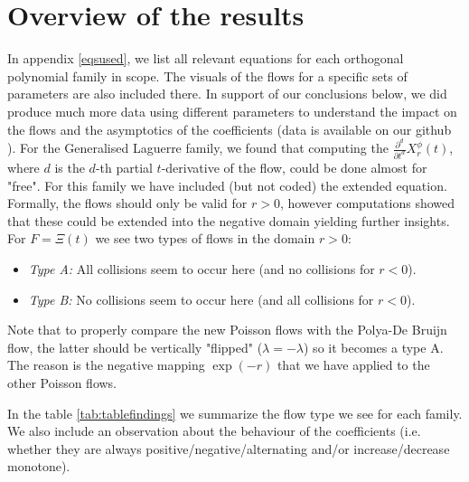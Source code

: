 \documentclass[a4paper,11pt,twoside]{amsart}
\begin{document}
\section{Overview of the results} \label{results}
In appendix \ref{eqsused}, we list all relevant equations for each orthogonal polynomial family in scope. The visuals of the flows for a specific sets of parameters are also included there. In support of our conclusions below, we did produce much more data using different parameters to understand the impact on the flows and the asymptotics of the coefficients (data is available on our github \cite{git}). For the Generalised Laguerre family, we found that computing the $\frac{\partial^{d}}{\partial t^{d}} X^{\mathcal{\phi}}_r(t)$, where $d$ is the $d$-th partial $t$-derivative of the flow, could be done almost for "free". For this family we have included (but not coded) the extended equation.  
Formally, the flows should only be valid for $r > 0$, however computations showed that these could be extended into the negative domain yielding further insights. For $F=\Xi(t)$ we see two types of flows in the domain $r > 0$:
\begin{itemize}
  \item \textit{Type A:} All collisions seem to occur here (and no collisions for $r < 0$).
  \item \textit{Type B:} No collisions seem to occur here (and all collisions for $r < 0$).
\end{itemize}
Note that to properly compare the new Poisson flows with the Polya-De Bruijn flow, the latter should be vertically "flipped" ($\lambda = -\lambda$) so it becomes a type A. The reason is the negative mapping $\exp(-r)$ that we have applied to the other Poisson flows. 

In the table \ref{tab:tablefindings} we summarize the flow type we see for each family. We also include an observation about the behaviour of the coefficients (i.e. whether they are always positive/negative/alternating and/or increase/decrease monotone).
\end{document}
